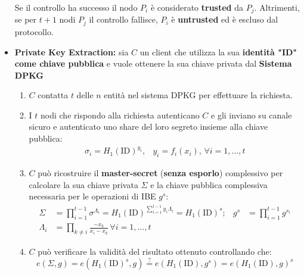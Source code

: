 \begin{definition}
\begin{itemize}
\[        \]
        \begin{remark}
            Se il controllo ha successo il nodo $P_i$ è considerato \textbf{trusted} da $P_j$. Altrimenti, se per $t+1$ nodi $P_j$ il controllo fallisce, $P_i$ è \textbf{untrusted} ed è escluso dal protocollo.
        \end{remark}
        \item \textbf{Private Key Extraction:} sia $C$ un client che utilizza la sua \textbf{identità "ID" come chiave pubblica} e vuole ottenere la sua chiave privata dal \textbf{Sistema DPKG}
        \begin{enumerate}
            \item $C$ contatta $t$ delle $n$ entità nel sistema DPKG per effettuare la richiesta.
            \item I $t$ nodi che rispondo alla richiesta autenticano $C$ e gli inviano su canale sicuro e autenticato uno share del loro segreto insieme alla chiave pubblica:
            \begin{equation*}
                \begin{aligned}
                    \sigma_i=H_1(\text{ID})^{y_i},&y_i=f_i(x_i),\,\forall i=1,\dots,t
                \end{aligned}
            \end{equation*}
            \item $C$ può ricostruire il \textbf{master-secret} (\textbf{senza esporlo}) complessivo per calcolare la sua chiave privata $\Sigma$ e la chiave pubblica complessiva necessaria per le operazioni di IBE $g^s$:
            \begin{equation*}
                \begin{aligned}
                    \Sigma&=\prod_{i=1}^{t-1}\sigma^{\Lambda_i}=H_1(\text{ID})^{\sum_{i=1}^{t-1}y_i\Lambda_i}=H_1(\text{ID})^s;&g^s&=\prod_{i=1}^{t-1}g^{s_i}\\
                    \Lambda_i&=\prod_{k \neq i}\frac{-x_k}{x_i-x_k}\,\forall i=1,\dots,t
                \end{aligned}
            \end{equation*}
            \item $C$ può verificare la validità del risultato ottenuto controllando che:
            \begin{equation*}
                e(\Sigma,g)=e(H_1(\text{ID})^s,g)\stackrel{?}{=}e(H_1(\text{ID}),g^s)=e(H_1(\text{ID}),g)^s
            \end{equation*}
        \end{enumerate}
    \end{itemize}
\end{definition}
